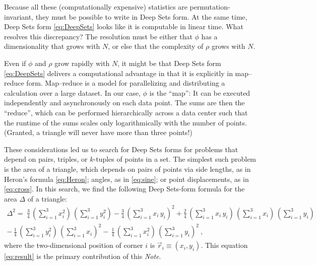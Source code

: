 \documentclass[12pt]{article}
\newcommand{\documentname}{\textsl{Note}}
\newcommand{\pseudosection}[1]
{}
\begin{document}
\pseudosection{Scalings}

Because all these (computationally expensive) statistics are permutation-invariant, they must be possible to write in Deep Sets form.
At the same time, Deep Sets form \eqref{eq:DeepSets} looks like it is computable in linear time. 
What resolves this discrepancy?
The resolution must be either that $\phi$ has a dimensionality that grows with $N$, or else that the complexity of $\rho$ grows with $N$.

Even if $\phi$ and $\rho$ grow rapidly with $N$, it might be that Deep Sets form \eqref{eq:DeepSets} delivers a computational advantage in that it is explicitly in map--reduce form.
Map--reduce is a model for parallelizing and distributing a calculation over a large dataset.
In our case, $\phi$ is the ``map'':
It can be executed independently and asynchronously on each data point.
The sums are then the ``reduce'', which can be performed hierarchically across a data center such that the runtime of the sums scales only logarithmically with the number of points.
(Granted, a triangle will never have more than three points!)

\pseudosection{Result}

These considerations led us to search for Deep Sets forms for problems that depend on pairs, triples, or $k$-tuples of points in a set. 
The simplest such problem is the area of a triangle, which depends on pairs of points via
side lengths, as in Heron's formula \eqref{eq:Heron};
angles, as in \eqref{eq:sine};
or point displacements, as in \eqref{eq:cross}.
In this search, we find the following Deep Sets-form formula for the area $\Delta$ of a triangle:
\begin{equation}
\label{eq:result}
\begin{multlined}
    \Delta^2 = \
    \frac{3}{4} \, (\sum_{i=1}^{3} x_i^2 ) \, (\sum_{i=1}^{3} y_i^2 )
    - \frac{3}{4} \, (\sum_{i=1}^{3} x_i \, y_i )^2 
    + \frac{2}{4} \, (\sum_{i=1}^{3} x_i \, y_i ) \, (\sum_{i=1}^{3} x_i ) \, (\sum_{i=1}^{3} y_i )
    \\
    - \, \frac{1}{4} \, (\sum_{i=1}^{3} y_i^2 ) \, (\sum_{i=1}^{3} x_i )^2
    - \, \frac{1}{4} \, (\sum_{i=1}^{3} x_i^2 ) \, (\sum_{i=1}^{3} y_i )^2
     ~,
\end{multlined}
\end{equation}
where the two-dimensional position of corner $i$ is $\vec{r}_i \equiv (x_i, y_i)$.
This equation \eqref{eq:result} is the primary contribution of this \documentname.
\end{document}
